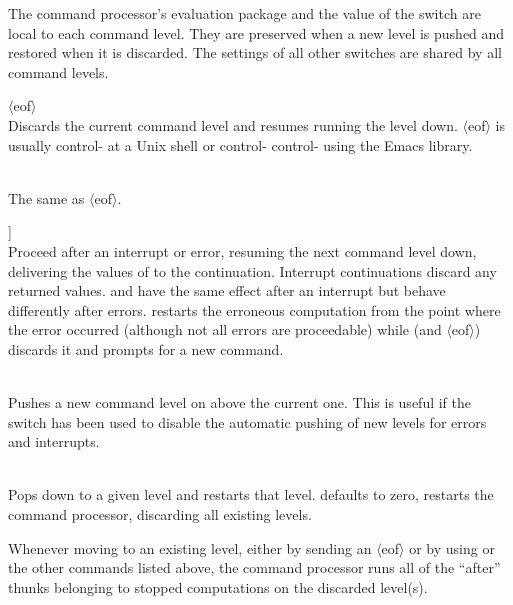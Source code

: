The command processor's evaluation package and the value of the
  switch are local to each command level.
They are preserved when a new level is pushed and restored when
 it is discarded.
The settings of all other switches are shared by all command levels.

\begin{description}
\item $\langle{}$eof$\rangle{}$\\
    Discards the current command level and resumes running the level down.
    $\langle{}$eof$\rangle{}$ is usually
    control- at a Unix shell or control- control- using
    the Emacs  library.

\item {}\\
 The same as $\langle{}$eof$\rangle{}$.

\item \code{,proceed [\cvar{exp} \ldots}]\\
 Proceed after an interrupt or error, resuming the next command
 level down, delivering the values of  to the continuation.
 Interrupt continuations discard any returned values.
  and  have the same effect after an interrupt
 but behave differently after errors.
  restarts the erroneous computation from the point where the
 error occurred (although not all errors are proceedable) while
  (and $\langle{}$eof$\rangle{}$) discards it and prompts for
 a new command.

\item {}\\
 Pushes a new command level on above the current one.
 This is useful if the  switch has been used
 to disable the automatic pushing of new levels for errors and interrupts.

\item {}\\
  Pops down to a given level and restarts that level.
   defaults to zero,  restarts the command
  processor, discarding all existing levels.

\end{description}

Whenever moving to an existing level, either by sending
 an $\langle{}$eof$\rangle{}$
 or by using  or the other commands listed above,
 the command processor runs all of the  ``after'' thunks
 belonging to stopped computations on the discarded level(s).

